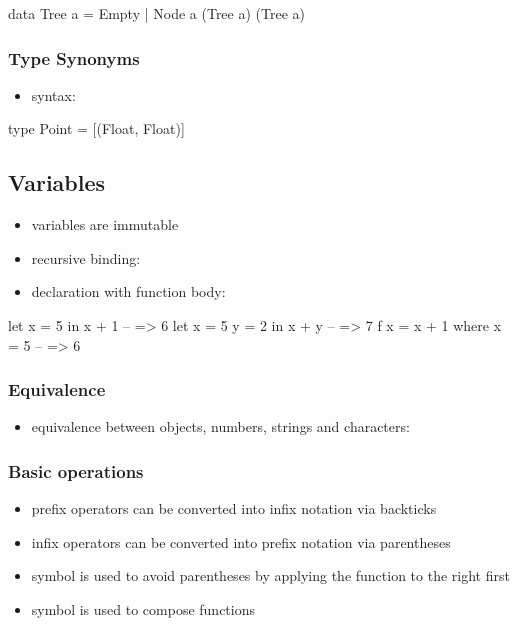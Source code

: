 \documentclass[a4paper,landscape,10pt]{article}
\begin{document}
\begin{multicols*}{2}
  \begin{haskell}
data Tree a = Empty | Node a (Tree a) (Tree a)
\end{haskell}

  \subsubsection{Type Synonyms}

  \begin{itemize}
    \item syntax: 
  \end{itemize}

  \begin{haskell}
type Point = [(Float, Float)]
\end{haskell}

  \subsection{Variables}

  \begin{itemize}
    \item variables are immutable
    \item recursive binding: 
    \item declaration with function body: 
  \end{itemize}

  \begin{haskell}
let x = 5 in x + 1 -- => 6
let x = 5 y = 2
in x + y -- => 7
f x = x + 1
where x = 5 -- => 6
\end{haskell}

  \subsubsection{Equivalence}

  \begin{itemize}
    \item equivalence between objects, numbers, strings and characters: \ihaskell{==}
  \end{itemize}

  \subsubsection{Basic operations}

  \begin{itemize}
    \item prefix operators can be converted into infix notation via backticks 
    \item infix operators can be converted into prefix notation via parentheses 
    \item symbol \ihaskell{\$} is used to avoid parentheses by applying the function to the right first
    \item symbol  is used to compose functions
  \end{itemize}


\end{multicols*}
\end{document}
